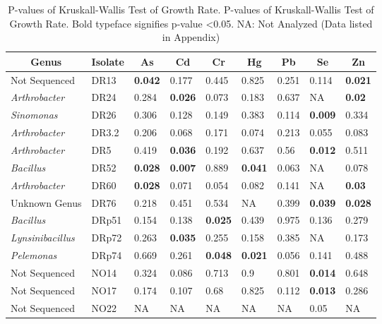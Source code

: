 \documentclass[ms, hidelinks]{uncgdissertationexp3}
\theoremstyle{plain}
\theoremstyle{definition}
\theoremstyle{remark}
\newcommand{\titlecaption}[2]{\caption[#1]{#1. #2}}
\begin{document}
\begin{table}
  \titlecaption{P-values of Kruskall-Wallis Test of Growth Rate}{P-values of Kruskall-Wallis Test of Growth Rate. Bold typeface signifies p-value <0.05. NA: Not Analyzed (Data listed in Appendix)}
  \label{tab:muvalue}
  \centering
  \begin{tabular}{lllllllll}
  \toprule
  \multicolumn{1}{c}{Genus} & \multicolumn{1}{c}{Isolate} & \multicolumn{1}{c}{As} & \multicolumn{1}{c}{Cd} & \multicolumn{1}{c}{Cr} & \multicolumn{1}{c}{Hg} & \multicolumn{1}{c}{Pb} & \multicolumn{1}{c}{Se} & \multicolumn{1}{c}{Zn}\\
  \midrule
  \rowcolor{gray!6}  Not Sequenced & DR13 & \textbf{0.042} & 0.177 & 0.445 & 0.825 & 0.251 & 0.114 & \textbf{0.021}\\
  \em{Arthrobacter} & DR24 & 0.284 & \textbf{0.026} & 0.073 & 0.183 & 0.637 & NA & \textbf{0.02}\\
  \rowcolor{gray!6}  \em{Sinomonas} & DR26 & 0.306 & 0.128 & 0.149 & 0.383 & 0.114 & \textbf{0.009} & 0.334\\
  \em{Arthrobacter} & DR3.2 & 0.206 & 0.068 & 0.171 & 0.074 & 0.213 & 0.055 & 0.083\\
  \rowcolor{gray!6}  \em{Arthrobacter} & DR5 & 0.419 & \textbf{0.036} & 0.192 & 0.637 & 0.56 & \textbf{0.012} & 0.511\\
  \em{Bacillus} & DR52 & \textbf{0.028} & \textbf{0.007} & 0.889 & \textbf{0.041} & 0.063 & NA & 0.078\\
  \rowcolor{gray!6}  \em{Arthrobacter} & DR60 & \textbf{0.028} & 0.071 & 0.054 & 0.082 & 0.141 & NA & \textbf{0.03}\\
  Unknown Genus & DR76 & 0.218 & 0.451 & 0.534 & NA & 0.399 & \textbf{0.039} & \textbf{0.028}\\
  \rowcolor{gray!6}  \em{Bacillus} & DRp51 & 0.154 & 0.138 & \textbf{0.025} & 0.439 & 0.975 & 0.136 & 0.279\\
  \em{Lynsinibacillus} & DRp72 & 0.263 & \textbf{0.035} & 0.255 & 0.158 & 0.385 & NA & 0.173\\
  \rowcolor{gray!6}  \em{Pelemonas} & DRp74 & 0.669 & 0.261 & \textbf{0.048} & \textbf{0.021} & 0.056 & 0.141 & 0.488\\
  Not Sequenced & NO14 & 0.324 & 0.086 & 0.713 & 0.9 & 0.801 & \textbf{0.014} & 0.648\\
  \rowcolor{gray!6}  Not Sequenced & NO17 & 0.174 & 0.107 & 0.68 & 0.825 & 0.112 & \textbf{0.013} & 0.286\\
  Not Sequenced & NO22 & NA & NA & NA & NA & NA & 0.05 & NA\\
  \bottomrule
  \end{tabular}
\end{table}
\end{document}
